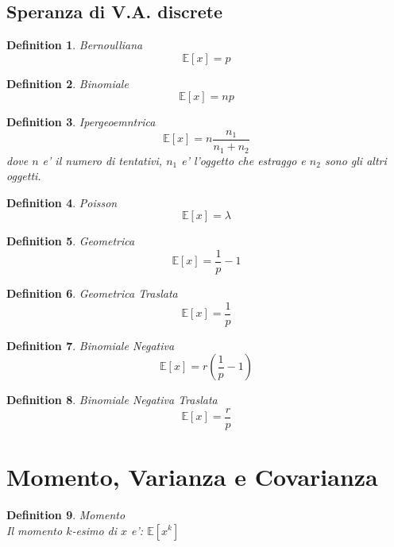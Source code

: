\documentclass{article}
\newtheorem{definition}{Definition}[section]
\begin{document}
    \subsection{Speranza di V.A. discrete}
    \begin{definition} Bernoulliana
        $$
        \mathbb E[x] = p
        $$
    \end{definition}

    \begin{definition} Binomiale
        $$
        \mathbb E[x] = np
        $$
    \end{definition}

    \begin{definition} Ipergeoemntrica
        $$
        \mathbb E[x] = n \frac{n_1}{n_1 + n_2}
        $$
        dove $n$ e' il numero di tentativi, $n_1$ e' l'oggetto che estraggo e $n_2$ sono gli altri oggetti.
    \end{definition}

    \begin{definition} Poisson
        $$
        \mathbb E[x] = \lambda
        $$
    \end{definition}

    \begin{definition} Geometrica
        $$
        \mathbb E[x] = \frac 1 p -1
        $$
    \end{definition}

    \begin{definition} Geometrica Traslata
        $$
        \mathbb E[x] = \frac 1 p
        $$
    \end{definition}

    \begin{definition} Binomiale Negativa
        $$
        \mathbb E[x] = r (\frac 1 p - 1)
        $$
    \end{definition}

    \begin{definition} Binomiale Negativa Traslata
        $$
        \mathbb E[x] = \frac r p
        $$
    \end{definition}

    \newpage
    \section{Momento, Varianza e Covarianza}
    \begin{definition} Momento \\
        Il momento $k$-esimo di $x$ e': $\mathbb E[x^k]$ 
    \end{definition}
\end{document}
